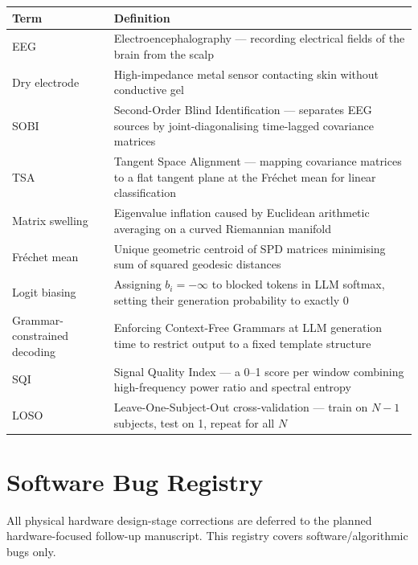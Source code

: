 \documentclass[11pt]{article}
\begin{document}
{\small
\begin{longtable}{p{}p{}}
\toprule
Term & Definition \\
\midrule
\endhead
EEG & Electroencephalography --- recording electrical fields of the brain from the scalp \\
Dry electrode & High-impedance metal sensor contacting skin without conductive gel \\
SOBI & Second-Order Blind Identification --- separates EEG sources by joint-diagonalising time-lagged covariance matrices \\
TSA & Tangent Space Alignment --- mapping covariance matrices to a flat tangent plane at the Fr\'echet mean for linear classification \\
Matrix swelling & Eigenvalue inflation caused by Euclidean arithmetic averaging on a curved Riemannian manifold \\
Fr\'echet mean & Unique geometric centroid of SPD matrices minimising sum of squared geodesic distances \\
Logit biasing & Assigning $b_i = -\infty$ to blocked tokens in LLM softmax, setting their generation probability to exactly 0 \\
Grammar-constrained decoding & Enforcing Context-Free Grammars at LLM generation time to restrict output to a fixed template structure \\
SQI & Signal Quality Index --- a 0--1 score per window combining high-frequency power ratio and spectral entropy \\
LOSO & Leave-One-Subject-Out cross-validation --- train on $N-1$ subjects, test on 1, repeat for all $N$ \\
\bottomrule
\end{longtable}
}

\section{Software Bug Registry}

All physical hardware design-stage corrections are deferred to the planned hardware-focused follow-up manuscript. This registry covers software/algorithmic bugs only.
\end{document}
